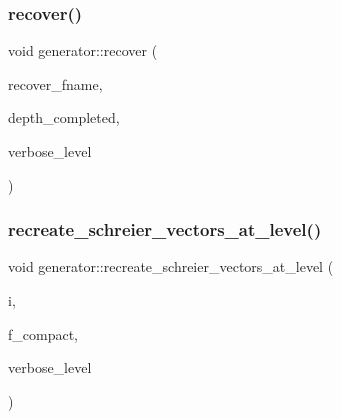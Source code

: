 \mbox{\label{classgenerator_a96b65270be862c206d5af97c1dde9c17}} 
\subsubsection{\texorpdfstring{recover()}{recover()}}
{\footnotesize\ttfamily void generator\+::recover (\begin{DoxyParamCaption}\item[{const \mbox{\hyperlink{galois_8h_ab6cc7b4aeb6ea31aba2b3fbfc83ff5e6}{B\+Y\+TE}} $\ast$}]{recover\+\_\+fname,  }\item[{\mbox{\hyperlink{galois_8h_a09fddde158a3a20bd2dcadb609de11dc}{I\+NT}} \&}]{depth\+\_\+completed,  }\item[{\mbox{\hyperlink{galois_8h_a09fddde158a3a20bd2dcadb609de11dc}{I\+NT}}}]{verbose\+\_\+level }\end{DoxyParamCaption})}

\mbox{\label{classgenerator_a7d190e196e7c9721c4135f40f01d922f}} 
\subsubsection{\texorpdfstring{recreate\+\_\+schreier\+\_\+vectors\+\_\+at\+\_\+level()}{recreate\_schreier\_vectors\_at\_level()}}
{\footnotesize\ttfamily void generator\+::recreate\+\_\+schreier\+\_\+vectors\+\_\+at\+\_\+level (\begin{DoxyParamCaption}\item[{\mbox{\hyperlink{galois_8h_a09fddde158a3a20bd2dcadb609de11dc}{I\+NT}}}]{i,  }\item[{\mbox{\hyperlink{galois_8h_a09fddde158a3a20bd2dcadb609de11dc}{I\+NT}}}]{f\+\_\+compact,  }\item[{\mbox{\hyperlink{galois_8h_a09fddde158a3a20bd2dcadb609de11dc}{I\+NT}}}]{verbose\+\_\+level }\end{DoxyParamCaption})}

\mbox{\label{classgenerator_a2ca7599e91bb012d41153aec95f081f7}} 
